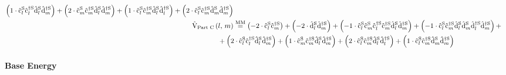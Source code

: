 \begin{equation}
\begin{split}
            \left(1 \cdot \cop[\schroedingerPicture]{l}{}\cop[\schroedingerPicture]{l}{\dagger}\dop[\schroedingerPicture]{l}{}\dop[\schroedingerPicture]{m}{\dagger}\right)
            +
            \left(2 \cdot \cop[\schroedingerPicture]{m}{}\cop[\schroedingerPicture]{m}{\dagger}\dop[\schroedingerPicture]{l}{}\dop[\schroedingerPicture]{m}{\dagger}\right)
            +
            \left(1 \cdot \cop[\schroedingerPicture]{l}{}\cop[\schroedingerPicture]{m}{\dagger}\dop[\schroedingerPicture]{l}{}\dop[\schroedingerPicture]{l}{\dagger}\right)
            +
            \left(2 \cdot \cop[\schroedingerPicture]{l}{}\cop[\schroedingerPicture]{m}{\dagger}\dop[\schroedingerPicture]{m}{}\dop[\schroedingerPicture]{m}{\dagger}\right)
        \\
        \VhamiltonianPartC{l}{m} &\stackrel{\text{MM}}{=} 
            \left(-2 \cdot \cop[\schroedingerPicture]{l}{}\cop[\schroedingerPicture]{m}{\dagger}\right)
            +
            \left(-2 \cdot \dop[\schroedingerPicture]{l}{}\dop[\schroedingerPicture]{m}{\dagger}\right)
            +
            \left(-1 \cdot \cop[\schroedingerPicture]{l}{}\cop[\schroedingerPicture]{m}{}\cop[\schroedingerPicture]{l}{\dagger}\cop[\schroedingerPicture]{m}{\dagger}\dop[\schroedingerPicture]{l}{}\dop[\schroedingerPicture]{m}{\dagger}\right)
            +
            \left(-1 \cdot \cop[\schroedingerPicture]{l}{}\cop[\schroedingerPicture]{m}{\dagger}\dop[\schroedingerPicture]{l}{}\dop[\schroedingerPicture]{m}{}\dop[\schroedingerPicture]{l}{\dagger}\dop[\schroedingerPicture]{m}{\dagger}\right)
            +\\&\mkern-40mu+
            \left(2 \cdot \cop[\schroedingerPicture]{l}{}\cop[\schroedingerPicture]{l}{\dagger}\dop[\schroedingerPicture]{l}{}\dop[\schroedingerPicture]{m}{\dagger}\right)
            +
            \left(1 \cdot \cop[\schroedingerPicture]{m}{}\cop[\schroedingerPicture]{m}{\dagger}\dop[\schroedingerPicture]{l}{}\dop[\schroedingerPicture]{m}{\dagger}\right)
            +
            \left(2 \cdot \cop[\schroedingerPicture]{l}{}\cop[\schroedingerPicture]{m}{\dagger}\dop[\schroedingerPicture]{l}{}\dop[\schroedingerPicture]{l}{\dagger}\right)
            +
            \left(1 \cdot \cop[\schroedingerPicture]{l}{}\cop[\schroedingerPicture]{m}{\dagger}\dop[\schroedingerPicture]{m}{}\dop[\schroedingerPicture]{m}{\dagger}\right)
        \\
    \end{split}
\end{equation}

\paragraph*{Base Energy}\makebox{}\\

